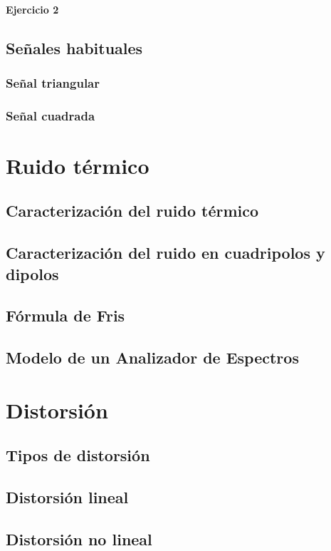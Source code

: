 \documentclass[a4paper]{book}
\begin{document}
\subsubsection{Ejercicio 2}

\section{Señales habituales}

\subsection{Señal triangular}

\subsection{Señal cuadrada}

\chapter{Ruido térmico}
\section{Caracterización del ruido térmico}
\section{Caracterización del ruido en cuadripolos y dipolos}
\section{Fórmula de Fris}
\section{Modelo de un Analizador de Espectros}

\chapter{Distorsión}
\section{Tipos de distorsión}
\section{Distorsión lineal}
\section{Distorsión no lineal}
\end{document}
